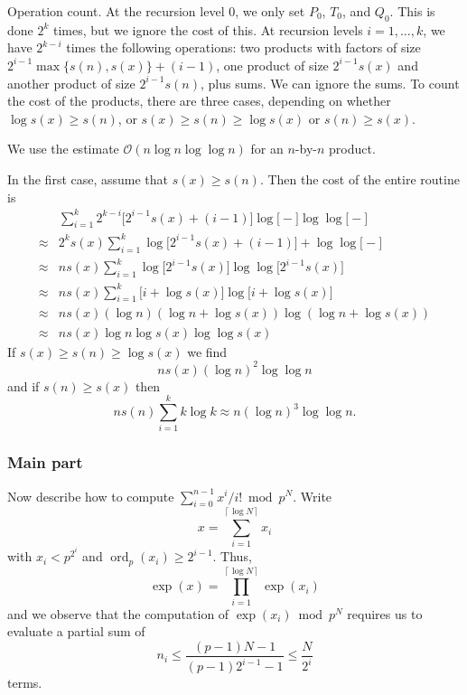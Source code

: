 \documentclass[a4paper,11pt]{article}
\theoremstyle{definition}
\DeclareMathOperator{\ord}{ord}
\providecommand{\ceil}[1]{\left\lceil#1\right\rceil}%
\begin{document}
Operation count.  At the recursion level $0$, we only set $P_0$, $T_0$, 
and $Q_0$.  This is done $2^k$ times, but we ignore the cost of this. 
At recursion levels $i = 1, \dotsc, k$, we have $2^{k-i}$ times the 
following operations:  two products with factors of size 
$2^{i-1} \max\{s(n), s(x)\} + (i-1)$, one product of size $2^{i-1} s(x)$ 
and another product of size $2^{i-1} s(n)$, plus sums.  We can ignore 
the sums.  To count the cost of the products, there are three cases, 
depending on whether $\log s(x) \geq s(n)$, or $s(x) \geq s(n) \geq \log s(x)$ 
or $s(n) \geq s(x)$.

We use the estimate $\mathcal{O}(n \log n \log \log n)$ for an 
$n$-by-$n$ product.

In the first case, assume that $s(x) \geq s(n)$. Then the cost of the entire 
routine is
\begin{align*}
        & \sum_{i=1}^k 2^{k-i} \bigl[ 2^{i-1} s(x) + (i - 1) \bigr] \log \bigl[ - \bigr] \log \log \bigl[ - \bigr] \\
\approx & 2^k s(x) \sum_{i=1}^k \log \bigl[ 2^{i-1} s(x) + (i - 1) \bigr] + \log \log \bigl[ - \bigr] \\
\approx & n s(x) \sum_{i=1}^k \log \bigl[ 2^{i-1} s(x) \bigr] \log \log \bigl[ 2^{i-1} s(x) \bigr] \\
\approx & n s(x) \sum_{i=1}^k \bigl[ i + \log s(x) \bigr] \log \bigl[i + \log s(x) \bigr] \\
\approx & n s(x) (\log n) (\log n + \log s(x)) \log (\log n + \log s(x)) \\
\approx & n s(x) \log n \log s(x) \log \log s(x)
\end{align*}
If $s(x) \geq s(n) \geq \log s(x)$ we find
\begin{equation*}
n s(x) (\log n)^2 \log \log n
\end{equation*}
and if $s(n) \geq s(x)$ then 
\begin{equation*}
n s(n) \sum_{i=1}^k k \log k \approx n (\log n)^3 \log \log n.
\end{equation*}

\subsubsection{Main part}

Now describe how to compute $\sum_{i=0}^{n-1} x^i / i! \bmod{p^N}$.  Write 
\begin{equation}
x = \sum_{i=1}^{\ceil{\log N}} x_i
\end{equation}
with $x_i < p^{2^i}$ and $\ord_p(x_i) \geq 2^{i-1}$.  Thus, 
\begin{equation}
\exp (x) = \prod_{i=1}^{\ceil{\log N}} \exp(x_i)
\end{equation}
and we observe that the computation of $\exp(x_i) \bmod p^N$ requires 
us to evaluate a partial sum of 
\begin{equation}
n_i \leq \frac{(p-1) N - 1}{(p-1) 2^{i-1} - 1} \leq \frac{N}{2^i}
\end{equation}
terms.
\end{document}
